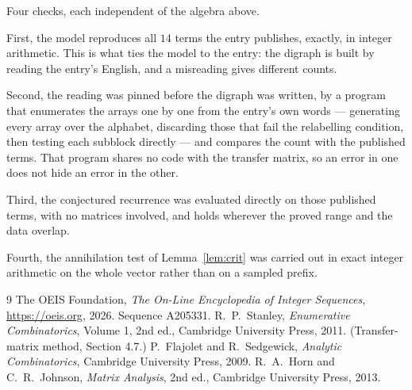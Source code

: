 \documentclass[11pt,a4paper]{article}
\theoremstyle{plain}
\theoremstyle{definition}
\begin{document}
Four checks, each independent of the algebra above.

First, the model reproduces all $14$ terms the entry publishes, exactly, in integer
arithmetic. This is what ties the model to the entry: the digraph is built by reading the
entry's English, and a misreading gives different counts.

Second, the reading was pinned before the digraph was written, by a program that enumerates
the arrays one by one from the entry's own words --- generating every array over the
alphabet, discarding those that fail the relabelling condition, then testing each subblock
directly --- and compares the count with the published terms. That program shares no code
with the transfer matrix, so an error in one does not hide an error in the other.

Third, the conjectured recurrence was evaluated directly on those published terms, with no
matrices involved, and holds wherever the proved range and the data overlap.

Fourth, the annihilation test of Lemma~\ref{lem:crit} was carried out in exact integer
arithmetic on the whole vector rather than on a sampled prefix.

\begin{thebibliography}{9}
 The OEIS Foundation, \emph{The On-Line Encyclopedia of Integer
Sequences}, \url{https://oeis.org}, 2026. Sequence A205331.
 R.~P.~Stanley, \emph{Enumerative Combinatorics}, Volume 1, 2nd ed.,
Cambridge University Press, 2011. (Transfer-matrix method, Section 4.7.)
 P.~Flajolet and R.~Sedgewick, \emph{Analytic Combinatorics}, Cambridge
University Press, 2009.
 R.~A.~Horn and C.~R.~Johnson, \emph{Matrix Analysis}, 2nd ed., Cambridge
University Press, 2013.
\end{thebibliography}
\end{document}
